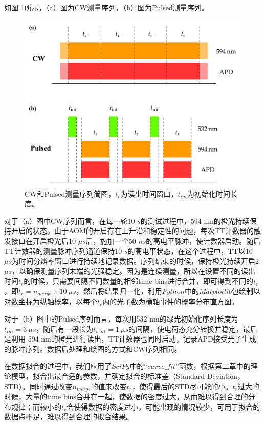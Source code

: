 \documentclass[type = bachelor]{whu-thesis}
\begin{document}
如图 \ref{fig: Measurement Sequence}所示，（a）图为CW测量序列，（b）图为Pulsed测量序列。
\begin{figure}
  \centering
  \includegraphics[width=1.0\textwidth]{figures/Chapter 1/Measurement Sequence.png}
  \caption[CW和Pulsed测量序列简图]{CW和Pulsed测量序列简图，$t_r$为读出时间窗口，$t_{ini}$为初始化时间长度。}
  \label{fig: Measurement Sequence}
\end{figure}

对于（a）图中CW序列而言，在每一轮10 $s$的测试过程中，594 nm的橙光持续保持开启的状态。由于AOM的开启存在上升沿和稳定性的问题，每次TT计数器的触发接口在开启橙光后10 $\mu s$后，施加一个50 $ns$的高电平脉冲，使计数器启动。随后TT计数器的测量脉冲序列通道保持10 $s$的高电平状态，在这个过程中，TT以10 $\mu s$为时间分辨率窗口进行持续地记录数据。序列结束的时候，保持橙光持续开启2 $\mu s$，以确保测量序列末端的光强稳定。因为是连续测量，所以在设置不同的读出时间$t_r$的时候，只需要间隔不同数量的相邻time bins进行合并，即可得到不同的$t_r$，即$t_r = n_{merge} \times 10\ \mu s$，然后将结果归一化，利用$Python$中的$Matplotlib$包绘制以对数坐标为纵轴概率，以每个$t_r$内的光子数为横轴事件的概率分布直方图。

对于（b）图中的Pulsed序列而言，每次用532 nm的绿光初始化序列长度为$t_{ini} = 3\ \mu s$，随后有一段长为$t_{wait} = 1\ \mu s$的间隔，使电荷态充分转换并稳定，最后是利用 594 nm的橙光进行读出，TT计数器也同时启动，记录APD接受光子生成的脉冲序列。数据后处理和绘图的方式和CW序列相同。

在数据拟合的过程中，我们应用了$SciPy$中的“$curve\_fit$”函数，根据第二章中的理论模型，拟合出最合适的参数，并确定拟合的标准差（Standard Deviation，STD）。同时通过改变$n_{merge}$的值来改变$t_r$，使得最后的STD尽可能的小。$t_r$过大的时候，大量的time bins合并在一起，使数据的密度过大，从而难以得到合理的分布规律；而较小的$t_r$会使得数据的密度过小，可能出现的情况较少，可用于拟合的数据点不足，难以得到合理的拟合结果。

 
\end{document}
